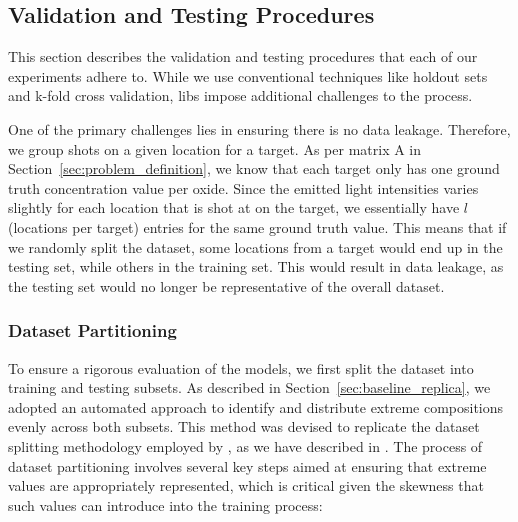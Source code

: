 \subsection{Validation and Testing Procedures}
This section describes the validation and testing procedures that each of our experiments adhere to.
While we use conventional techniques like holdout sets and k-fold cross validation, \gls{libs} impose additional challenges to the process.

One of the primary challenges lies in ensuring there is no data leakage.
Therefore, we group shots on a given location for a target.
As per matrix A in Section~\ref{sec:problem_definition}, we know that each target only has one ground truth concentration value per oxide.
Since the emitted light intensities varies slightly for each location that is shot at on the target, we essentially have $l$ (locations per target) entries for the same ground truth value.
This means that if we randomly split the dataset, some locations from a target would end up in the testing set, while others in the training set.
This would result in data leakage, as the testing set would no longer be representative of the overall dataset.



\subsubsection{Dataset Partitioning}
To ensure a rigorous evaluation of the models, we first split the dataset into training and testing subsets.
As described in Section~\ref{sec:baseline_replica}, we adopted an automated approach to identify and distribute extreme compositions evenly across both subsets.
This method was devised to replicate the dataset splitting methodology employed by \citet{andersonImprovedAccuracyQuantitative2017}, as we have described in \citet{p9_paper}.
The process of dataset partitioning involves several key steps aimed at ensuring that extreme values are appropriately represented, which is critical given the skewness that such values can introduce into the training process:

